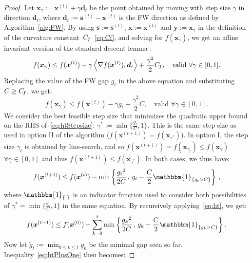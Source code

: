 \documentclass{article}
\newcommand{\x}{\bm{x}}
\newcommand{\y}{\bm{y}}
\newcommand{\s}{\bm{s}}
\newcommand{\xt}{\bm{x}^{(t)}}
\newcommand{\st}{\bm{s}^{(t)}}
\newcommand{\stepsize}{\gamma}
\newcommand{\Cf}{C_{\hspace{-0.08em}f}}
\newcommand{\dd}{\bm{d}}
\newcommand{\indic}{\mathbbm{1}} %
\newcommand{\0}{\mathbf{0}} %
\begin{document}
\begin{proof}
Let $\x_\stepsize
:=  \x^{(t)} + \stepsize \dd_t$ be the point obtained by moving with
step size $\stepsize$ in direction $\dd_t$, where $\dd_t := \st - \xt$ is the FW direction as defined 
by Algorithm~\ref{alg:FW}. By using $\s := \st$, $\x := \x^{(t)}$ and $\y := \x_\stepsize$ in the definition of the
curvature constant~$\Cf$~\eqref{eq:Cf}, and solving for $f(\x_\stepsize)$, we
get an affine invariant version of the standard descent lemma \citep[see e.g. (1.2.5) in][]{Nesterov:2004:lectures}:
\begin{equation} \label{eq:descentLemmaCf}
f(\x_\stepsize) \leq f(\x^{(t)}) + \stepsize \left\langle  \nabla
f(\x^{(t)}), \dd_t \right\rangle + \frac{\stepsize^2}{2} \Cf, \quad \text{valid $\forall
\stepsize \in [0,1]$}.
\end{equation}
Replacing the value of the FW gap $g_t$ in the above equation and substituting $C \geq \Cf$, we get:
\begin{equation} \label{eq:htStepsize}
f(\x_\stepsize) \leq f(\x^{(t)}) - \stepsize g_t + \frac{\stepsize^2}{2} C, \quad \text{valid $\forall
\stepsize \in [0,1]$}.
\end{equation}
We consider the best feasible step size that minimizes the quadratic upper bound on the RHS of~\eqref{eq:htStepsize}: $\stepsize^* := \min\{\frac{g_t}{C}, 1\}$. This is the same step size as used in option II of the algorithm ($f(\x^{(t+1)}) = f(\x_{\stepsize^*})$).  
In option I, the step size $\stepsize_t$ is obtained by line-search, and so
$f(\x^{(t+1)}) = f(\x_{\stepsize_t}) \leq  f(\x_\stepsize)$ $\forall
\stepsize \in [0,1]$ and thus $f(\x^{(t+1)}) \leq f(\x_{\stepsize^*})$. In both cases, we thus have:
\begin{equation} \label{eq:ht}
f(\x^{(t+1)}) \leq f(\x^{(t)}) - \min\left\{ \frac{{g_t}^2}{2 C} \, , \, g_t - \frac{C}{2} \indic_{ \{g_t > C \}} \right\} \, ,
\end{equation}
where $\indic_{ \{ \cdot \}}$ is an indicator function used to consider both possibilities of $\stepsize^* = \min\{\frac{g_t}{C}, 1\}$ in the same equation.
By recursively applying~\eqref{eq:ht}, we get:
\begin{equation} \label{eq:htPlusOne}
f(\x^{(t+1)}) \leq f(\x^{(0)}) - \sum_{k=0}^{t} \min\left\{ \frac{{g_k}^2}{2 C} \, , \, g_k - \frac{C}{2} \indic_{ \{g_k > C \}}\right\}.
\end{equation}
Now let $\tilde{g}_t := \min_{0\leq k \leq t} g_k$ be the minimal gap seen so far. Inequality~\eqref{eq:htPlusOne} then becomes:

\end{proof}
\end{document}
